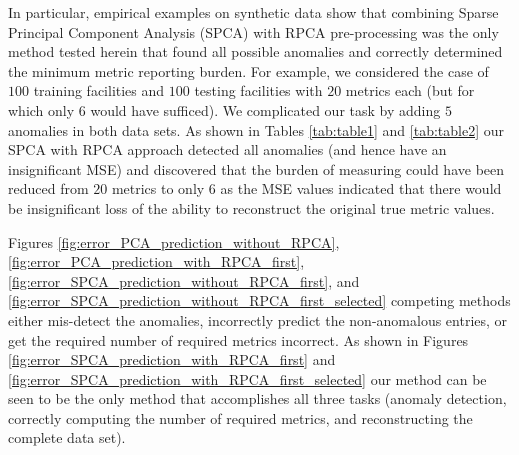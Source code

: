 \documentclass[conference]{IEEEtran}
\begin{document}
In particular, empirical examples on synthetic data show that combining Sparse Principal Component Analysis (SPCA) with RPCA pre-processing was the only method tested herein that found all possible anomalies 
and correctly determined the minimum metric reporting burden. For example, we considered the case of $100$ training facilities and $100$ testing facilities with $20$ metrics each (but for which only $6$ would have sufficed). We complicated our task by adding $5$ anomalies in both  data sets.  
As shown in Tables \ref{tab:table1} and \ref{tab:table2} our SPCA with RPCA approach detected all anomalies (and hence have an insignificant MSE) and discovered that the burden of measuring could have been reduced from $20$ metrics to only $6$ as the MSE values indicated that there would be insignificant loss of the ability to reconstruct the original true metric values.


Figures \ref{fig:error_PCA_prediction_without_RPCA}, \ref{fig:error_PCA_prediction_with_RPCA_first}, \ref{fig:error_SPCA_prediction_without_RPCA_first}, and \ref{fig:error_SPCA_prediction_without_RPCA_first_selected} competing methods either mis-detect the anomalies, incorrectly predict the non-anomalous entries, or get the required number of required metrics incorrect.
As shown in Figures \ref{fig:error_SPCA_prediction_with_RPCA_first} and \ref{fig:error_SPCA_prediction_with_RPCA_first_selected} our method can be seen to be the only method that accomplishes all three tasks (anomaly detection, correctly computing the number of required metrics, and reconstructing the complete data set).
\end{document}
